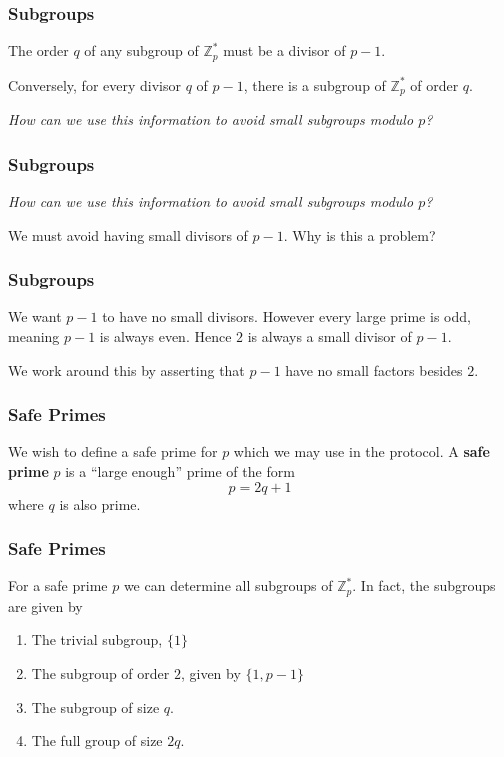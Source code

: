 \documentclass{beamer}
\newcommand{\<}{\langle}
\renewcommand{\>}{\rangle}
\newcommand{\Z}{\mathbb{Z}}
\begin{document}
\begin{frame}
\frametitle{Subgroups}

The order $q$ of any subgroup of $\Z_p^*$ must be a divisor of $p-1$. \newline

Conversely, for every divisor $q$ of $p-1$, there is a subgroup of $\Z_p^*$ of order $q$. \newline

\emph{How can we use this information to avoid small subgroups modulo $p$?}
\end{frame}


\begin{frame}
\frametitle{Subgroups}
\emph{How can we use this information to avoid small subgroups modulo $p$?}\newline

We must avoid having small divisors of $p-1$. Why is this a problem?
\end{frame}

\begin{frame}
\frametitle{Subgroups}

We want $p-1$ to have no small divisors. However every large prime is odd, meaning $p-1$ is always even. Hence $2$ is always a small divisor of $p-1$.\newline

We work around this by asserting that $p-1$ have no small factors besides $2$.
\end{frame}


\begin{frame}
\frametitle{Safe Primes}

We wish to define a {safe prime} for $p$ which we may use in the protocol. A \textbf{safe prime} $p$ is a ``large enough'' prime of the form
\[
p = 2q + 1
\]
where $q$ is also prime. 
\end{frame}


\begin{frame}
\frametitle{Safe Primes}

For a safe prime $p$ we can determine all subgroups of $\Z_p^*$. In fact, the subgroups are given by
\begin{enumerate}[(1)]
\item The trivial subgroup, $\{1\}$
\item The subgroup of order $2$, given by $\{1, p-1\}$
\item The subgroup of size $q$.
\item The full group of size $2q$.
\end{enumerate}
\end{frame}
\end{document}
